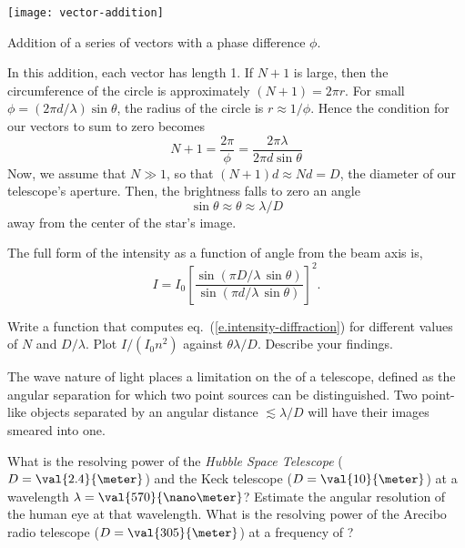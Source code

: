 \begin{marginfigure}
\centering\texttt{[image: vector-addition]}
\caption[Addition of vectors with phase differences]{Addition of a series of vectors with a phase difference $\phi$.}
\label{f.vector-addition}
\end{marginfigure}

In this addition, each vector has length 1. If $N+1$ is large, then the circumference of the circle is approximately $(N+1) = 2\pi r$.  For small $\phi = (2\pi d/\lambda)\sin\theta$, the radius of the circle is $r \approx 1/\phi$.  Hence the condition for our vectors to sum to zero becomes
\[ N+1 = \frac{2\pi}{\phi} = \frac{2\pi\lambda}{2\pi d\sin\theta} \]
Now, we assume that $N \gg 1$, so that $(N+1)d \approx Nd = D$, the diameter of our telescope's aperture.  Then, the brightness falls to zero an angle
\[ \sin\theta \approx \theta \approx\lambda/D\]
away from the center of the star's image.

The full form of the intensity as a function of angle from the beam axis is,
\begin{equation}\label{e.intensity-diffraction}
I = I_{0}\left[\frac{\sin\left(\pi D/\lambda\,\sin\theta\right)}{\sin\left(\pi d/\lambda\,\sin\theta\right)}\right]^{2}.
\end{equation}

\begin{exercisebox}
Write a  function that computes eq.~(\ref{e.intensity-diffraction}) for different values of $N$ and $D/\lambda$.  Plot $I/(I_{0}n^{2})$ against $\theta\lambda/D$.  Describe your findings.
\end{exercisebox}

The wave nature of light places a limitation on the  of a telescope, defined as the   angular separation for which two point sources can be distinguished.  Two point-like objects separated by an angular distance $\lesssim \lambda/D$ will have their images smeared into one.

\begin{exercisebox}
What is the resolving power of the \emph{Hubble Space Telescope} ($D=\val{2.4}{\meter}$) and the Keck telescope ($D=\val{10}{\meter}$) at a wavelength $\lambda = \val{570}{\nano\meter}$? Estimate the angular resolution of the human eye at that wavelength. What is the resolving power of the Arecibo radio telescope ($D = \val{305}{\meter}$) at a frequency of ?
\end{exercisebox}


